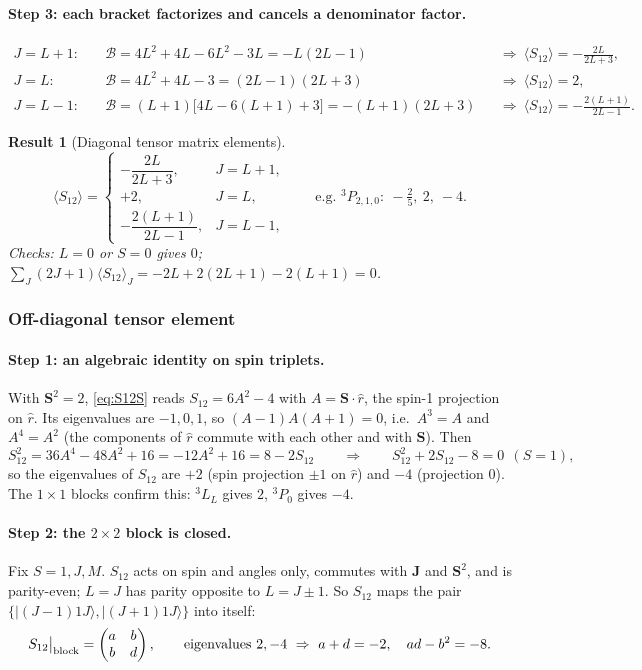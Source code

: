 \documentclass[11pt,a4paper]{article}
\numberwithin{equation}{section}
\theoremstyle{definition}
\theoremstyle{plain}
\newtheorem{result}[definition]{Result}
\theoremstyle{remark}
\numberwithin{algorithm}{section}
\newcommand{\vS}{\bm S}
\newcommand{\vJ}{\bm J}
\newcommand{\ket}[1]{|#1\rangle}
\begin{document}
\paragraph{Step 3: each bracket factorizes and cancels a denominator factor.}
\begin{align*}
J=L+1:&\quad \mathcal B=4L^2+4L-6L^2-3L=-L(2L-1) &&\Rightarrow\ \langle S_{12}\rangle=-\frac{2L}{2L+3},\\
J=L:&\quad \mathcal B=4L^2+4L-3=(2L-1)(2L+3) &&\Rightarrow\ \langle S_{12}\rangle=2,\\
J=L-1:&\quad \mathcal B=(L+1)\big[4L-6(L+1)+3\big]=-(L+1)(2L+3) &&\Rightarrow\ \langle S_{12}\rangle=-\frac{2(L+1)}{2L-1}.
\end{align*}
\begin{result}[Diagonal tensor matrix elements]
\begin{equation}
\langle S_{12}\rangle=\begin{cases}-\dfrac{2L}{2L+3},&J=L+1,\\[2mm] +2,&J=L,\\[1mm] -\dfrac{2(L+1)}{2L-1},&J=L-1,\end{cases}
\qquad\text{e.g. }{}^3P_{2,1,0}:\ -\tfrac25,\ 2,\ -4 .
\end{equation}
Checks: $L=0$ or $S=0$ gives $0$; $\sum_J(2J+1)\langle S_{12}\rangle_J=-2L+2(2L+1)-2(L+1)=0$.
\end{result}

\subsubsection{Off-diagonal tensor element}\label{sec:S12offdiag}
\paragraph{Step 1: an algebraic identity on spin triplets.} With $\vS^2=2$, \eqref{eq:S12S} reads $S_{12}=6A^2-4$ with $A=\vS\cdot\hat r$, the spin-1 projection on $\hat r$. Its eigenvalues are $-1,0,1$, so $(A-1)A(A+1)=0$, i.e.\ $A^3=A$ and $A^4=A^2$ (the components of $\hat r$ commute with each other and with $\vS$). Then
\begin{equation}
S_{12}^2=36A^4-48A^2+16=-12A^2+16=8-2S_{12}\qquad\Longrightarrow\qquad S_{12}^2+2S_{12}-8=0\ \ (S=1),
\label{eq:S12sq}
\end{equation}
so the eigenvalues of $S_{12}$ are $+2$ (spin projection $\pm1$ on $\hat r$) and $-4$ (projection 0). The $1\times1$ blocks confirm this: ${}^3L_L$ gives $2$, ${}^3P_0$ gives $-4$.
\paragraph{Step 2: the $2\times2$ block is closed.} Fix $S=1,J,M$. $S_{12}$ acts on spin and angles only, commutes with $\vJ$ and $\vS^2$, and is parity-even; $L=J$ has parity opposite to $L=J\pm1$. So $S_{12}$ maps the pair $\{\ket{(J{-}1)1J},\ket{(J{+}1)1J}\}$ into itself:
\begin{equation*}
S_{12}\big|_{\rm block}=\begin{pmatrix}a&b\\b&d\end{pmatrix},\qquad\text{eigenvalues }2,-4\ \Rightarrow\ a+d=-2,\quad ad-b^2=-8 .
\end{equation*}
\end{document}

